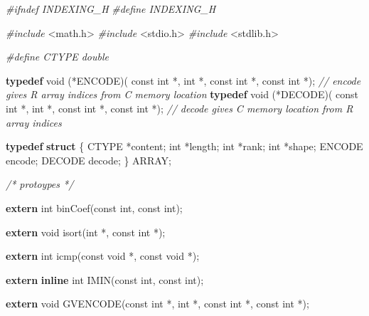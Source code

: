 \documentclass[
  12pt,
]{article}
\newenvironment{Shaded}{\begin{snugshade}}{\end{snugshade}}
\newcommand{\CommentTok}[1]{\textcolor[rgb]{0.56,0.35,0.01}{\textit{#1}}}
\newcommand{\DataTypeTok}[1]{\textcolor[rgb]{0.13,0.29,0.53}{#1}}
\newcommand{\ImportTok}[1]{#1}
\newcommand{\KeywordTok}[1]{\textcolor[rgb]{0.13,0.29,0.53}{\textbf{#1}}}
\newcommand{\NormalTok}[1]{#1}
\newcommand{\PreprocessorTok}[1]{\textcolor[rgb]{0.56,0.35,0.01}{\textit{#1}}}
\begin{document}
\begin{Shaded}
\begin{Highlighting}[]
\PreprocessorTok{\#ifndef INDEXING\_H}
\PreprocessorTok{\#define INDEXING\_H}

\PreprocessorTok{\#include }\ImportTok{\textless{}math.h\textgreater{}}
\PreprocessorTok{\#include }\ImportTok{\textless{}stdio.h\textgreater{}}
\PreprocessorTok{\#include }\ImportTok{\textless{}stdlib.h\textgreater{}}

\PreprocessorTok{\#define CTYPE double}

\KeywordTok{typedef} \DataTypeTok{void}\NormalTok{ (*ENCODE)(}
    \DataTypeTok{const} \DataTypeTok{int}\NormalTok{ *, }\DataTypeTok{int}\NormalTok{ *, }\DataTypeTok{const} \DataTypeTok{int}\NormalTok{ *,}
    \DataTypeTok{const} \DataTypeTok{int}\NormalTok{ *); }\CommentTok{// encode gives R array indices from C memory location}
\KeywordTok{typedef} \DataTypeTok{void}\NormalTok{ (*DECODE)(}
    \DataTypeTok{const} \DataTypeTok{int}\NormalTok{ *, }\DataTypeTok{int}\NormalTok{ *, }\DataTypeTok{const} \DataTypeTok{int}\NormalTok{ *,}
    \DataTypeTok{const} \DataTypeTok{int}\NormalTok{ *); }\CommentTok{// decode gives C memory location from R array indices}

\KeywordTok{typedef} \KeywordTok{struct}\NormalTok{ \{}
\NormalTok{  CTYPE *content;}
  \DataTypeTok{int}\NormalTok{ *length;}
  \DataTypeTok{int}\NormalTok{ *rank;}
  \DataTypeTok{int}\NormalTok{ *shape;}
\NormalTok{  ENCODE encode;}
\NormalTok{  DECODE decode;}
\NormalTok{\} ARRAY;}

\CommentTok{/* protoypes */}

\KeywordTok{extern} \DataTypeTok{int}\NormalTok{ binCoef(}\DataTypeTok{const} \DataTypeTok{int}\NormalTok{, }\DataTypeTok{const} \DataTypeTok{int}\NormalTok{);}

\KeywordTok{extern} \DataTypeTok{void}\NormalTok{ isort(}\DataTypeTok{int}\NormalTok{ *, }\DataTypeTok{const} \DataTypeTok{int}\NormalTok{ *);}

\KeywordTok{extern} \DataTypeTok{int}\NormalTok{ icmp(}\DataTypeTok{const} \DataTypeTok{void}\NormalTok{ *, }\DataTypeTok{const} \DataTypeTok{void}\NormalTok{ *);}

\KeywordTok{extern} \KeywordTok{inline} \DataTypeTok{int}\NormalTok{ IMIN(}\DataTypeTok{const} \DataTypeTok{int}\NormalTok{, }\DataTypeTok{const} \DataTypeTok{int}\NormalTok{);}

\KeywordTok{extern} \DataTypeTok{void}\NormalTok{ GVENCODE(}\DataTypeTok{const} \DataTypeTok{int}\NormalTok{ *, }\DataTypeTok{int}\NormalTok{ *, }\DataTypeTok{const} \DataTypeTok{int}\NormalTok{ *, }\DataTypeTok{const} \DataTypeTok{int}\NormalTok{ *);}


\end{Highlighting}
\end{Shaded}
\end{document}
